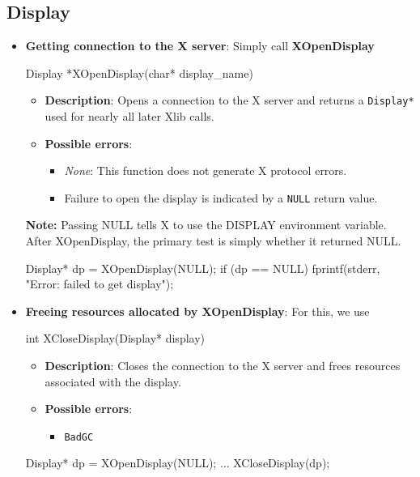 \documentclass{report}
\begin{document}
    \subsection{Display}
    \begin{itemize}
        \item \textbf{Getting connection to the X server}: Simply call \textbf{XOpenDisplay}
            \bigbreak \noindent 
            \begin{cppcode}
                Display *XOpenDisplay(char* display_name)
            \end{cppcode}
            \begin{itemize}
                \item \textbf{Description}: Opens a connection to the X server and returns a \texttt{Display*} used for nearly all later Xlib calls.
                \item \textbf{Possible errors}:
                    \begin{itemize}
                        \item \textit{None}: This function does not generate X protocol errors.
                        \item Failure to open the display is indicated by a \texttt{NULL} return value.
                    \end{itemize}
            \end{itemize}
            \textbf{Note:} Passing NULL tells X to use the DISPLAY environment variable.
            \bigbreak \noindent 
            After XOpenDisplay, the primary test is simply whether it returned NULL.
            \bigbreak \noindent 
            \begin{cppcode}
            Display* dp = XOpenDisplay(NULL);
            if (dp == NULL) {
                fprintf(stderr, "Error: failed to get display");
            }
            \end{cppcode}
        \item \textbf{Freeing resources allocated by XOpenDisplay}: For this, we use
            \bigbreak \noindent 
            \begin{cppcode}
                int XCloseDisplay(Display* display)
            \end{cppcode}
            \begin{itemize}
                \item \textbf{Description}: Closes the connection to the X server and frees resources associated with the display.
                \item \textbf{Possible errors}:
                    \begin{itemize}
                        \item \texttt{BadGC}
                    \end{itemize}
            \end{itemize}
            \bigbreak \noindent 
            \begin{cppcode}
            Display* dp = XOpenDisplay(NULL);
            ...
            XCloseDisplay(dp);
            \end{cppcode}


    \end{itemize}
\end{document}

